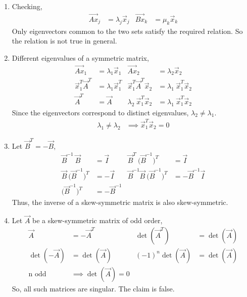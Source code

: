 \begin{enumerate}
    \item Checking,
          \begin{align}
              \vec{Ax}_j & = \lambda_j \vec{x}_j &
              \vec{Bx}_k & = \mu_k \vec{x}_k
          \end{align}
          Only eigenvectors common to the two sets satisfy the required relation. So
          the relation is not true in general.

    \item Different eigenvalues of a symmetric matrix,
          \begin{align}
              \vec{Ax}_1                       & = \lambda_1 \vec{x}_1              &
              \vec{Ax}_2                       & = \lambda_2 \vec{x}_2                \\
              \vec{x}_1^T \vec{A}^T            & = \lambda_1 \vec{x}_1^T            &
              \vec{x}_1^T \vec{A}^T \vec{x}_2  & = \lambda_1\ \vec{x}_1^T \vec{x}_2   \\
              \vec{A}^T                        & = \vec{A}                          &
              \lambda_2\ \vec{x}_1^T \vec{x}_2 & = \lambda_1\ \vec{x}_1^T \vec{x}_2
          \end{align}
          Since the eigenvectors correspond to distinct eigenvalues, $ \lambda_2
              \neq \lambda_1 $.
          \begin{align}
              \lambda_1 \neq \lambda_2 & \implies \vec{x}_1^T \vec{x}_2 = 0
          \end{align}

    \item Let $ \vec{B}^T = -\vec{B} $,
          \begin{align}
              \vec{B}^{-1}\ \vec{B}                          & = \vec{I}  &
              \vec{B}^T\ \Big(\vec{B}^{-1}\Big)^T            & = \vec{I}    \\
              \vec{B}\ \Big(\vec{B}^{-1}\Big)^T              & = -\vec{I} &
              \vec{B}^{-1} \vec{B}\ \Big(\vec{B}^{-1}\Big)^T & =
              -\vec{B}^{-1} \vec{I}                                         \\
              \Big(\vec{B}^{-1}\Big)^T                       & =
              -\vec{B}^{-1}
          \end{align}
          Thus, the inverse of a skew-symmetric matrix is also skew-symmetric.

    \item Let $ \vec{A} $ be a skew-symmetric matrix of odd order,
          \begin{align}
              \vec{A}              & = -\vec{A}^T               &
              \det(\vec{A}^T)      & = \det(\vec{A})              \\
              \det(-\vec{A})       & = \det(\vec{A})            &
              (-1)^n \det(\vec{A}) & = \det(\vec{A})              \\
              \text{n odd}\        & \implies \det(\vec{A}) = 0
          \end{align}
          So, all such matrices are singular. The claim is \textcolor{y_p}{false}.


\end{enumerate}
